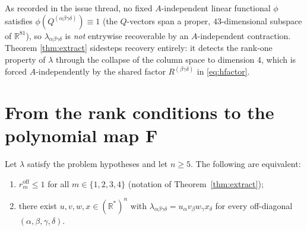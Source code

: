 \begin{remark}
As recorded in the issue thread, no fixed $A$-independent linear functional $\phi$
satisfies $\phi(Q^{(\alpha\beta\gamma\delta)})\equiv1$ (the $Q$-vectors span a proper,
$43$-dimensional subspace of $\mathbb R^{81}$), so $\lambda_{\alpha\beta\gamma\delta}$ is
\emph{not} entrywise recoverable by an $A$-independent contraction. Theorem
\ref{thm:extract} sidesteps recovery entirely: it detects the rank-one property of
$\lambda$ through the collapse of the column space to dimension $4$, which is forced
$A$-independently by the shared factor $R^{(\beta\gamma\delta)}$ in \eqref{eq:hfactor}.
\end{remark}

\section{From the rank conditions to the polynomial map $\mathbf F$}

\begin{lemma}\label{lem:offrank1}
Let $\lambda$ satisfy the problem hypotheses and let $n\ge5$. The following are
equivalent:
\begin{enumerate}
\item[(a)] $r_m^{\mathrm{off}}\le1$ for all $m\in\{1,2,3,4\}$
(notation of Theorem~\ref{thm:extract});
\item[(b)] there exist $u,v,w,x\in(\mathbb R^*)^n$ with
$\lambda_{\alpha\beta\gamma\delta}=u_\alpha v_\beta w_\gamma x_\delta$ for every
off-diagonal $(\alpha,\beta,\gamma,\delta)$.
\end{enumerate}
\end{lemma}

